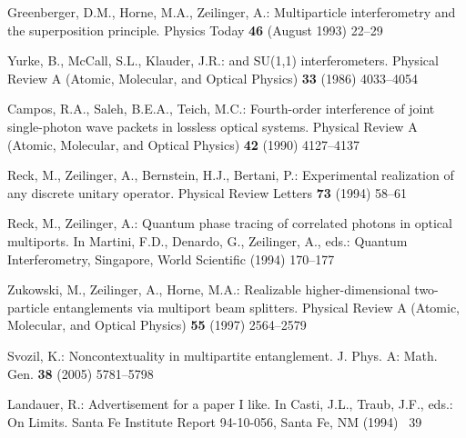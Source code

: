 \documentclass{llncs}
\begin{document}
\begin{thebibliography}{10}
Greenberger, D.M., Horne, M.A., Zeilinger, A.:
\newblock Multiparticle interferometry and the superposition principle.
\newblock Physics Today \textbf{46} (August 1993)  22--29

Yurke, B., McCall, S.L., Klauder, J.R.:
 and {SU(1,1)} interferometers.
\newblock Physical Review A (Atomic, Molecular, and Optical Physics)
  \textbf{33} (1986)  4033--4054

Campos, R.A., Saleh, B.E.A., Teich, M.C.:
\newblock Fourth-order interference of joint single-photon wave packets in
  lossless optical systems.
\newblock Physical Review A (Atomic, Molecular, and Optical Physics)
  \textbf{42} (1990)  4127--4137

Reck, M., Zeilinger, A., Bernstein, H.J., Bertani, P.:
\newblock Experimental realization of any discrete unitary operator.
\newblock Physical Review Letters \textbf{73} (1994)  58--61

Reck, M., Zeilinger, A.:
\newblock Quantum phase tracing of correlated photons in optical multiports.
\newblock In Martini, F.D., Denardo, G., Zeilinger, A., eds.: Quantum
  Interferometry, Singapore, World Scientific (1994)  170--177

Zukowski, M., Zeilinger, A., Horne, M.A.:
\newblock Realizable higher-dimensional two-particle entanglements via
  multiport beam splitters.
\newblock Physical Review A (Atomic, Molecular, and Optical Physics)
  \textbf{55} (1997)  2564--2579

Svozil, K.:
\newblock Noncontextuality in multipartite entanglement.
\newblock J. Phys. A: Math. Gen. \textbf{38} (2005)  5781--5798

Landauer, R.:
\newblock Advertisement for a paper {I} like.
\newblock In Casti, J.L., Traub, J.F., eds.: On Limits.
\newblock Santa Fe Institute Report 94-10-056, Santa Fe, NM (1994) ~39

\end{thebibliography}
\end{document}
